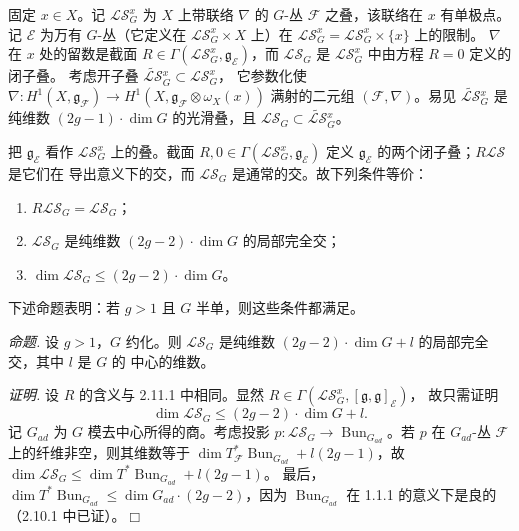  固定 $x\in X$。记 $\mathcal{LS}_G^x$ 为 $X$ 上带联络
$\nabla$ 的 $G$-丛 $\mathcal{F}$ 之叠，该联络在 $x$ 有单极点。
记 $\mathcal{E}$ 为万有 $G$-丛（它定义在
$\mathcal{LS}_G^x\times X$ 上）在
$\mathcal{LS}_G^x=\mathcal{LS}_G^x\times\{x\}$ 上的限制。
$\nabla$ 在 $x$ 处的留数是截面
$R\in\Gamma(\mathcal{LS}_G^x,\mathfrak{g}_{\mathcal{E}})$，而
$\mathcal{LS}_G$ 是 $\mathcal{LS}_G^x$ 中由方程 $R=0$ 定义的闭子叠。
考虑开子叠 $\widetilde{\mathcal{LS}}{}_G^x\subset\mathcal{LS}_G^x$，
它参数化使 $\nabla:H^1(X,\mathfrak{g}_{\mathcal{F}})\to
H^1(X,\mathfrak{g}_{\mathcal{F}}\otimes\omega_X(x))$ 满射的二元组
$(\mathcal{F},\nabla)$。易见 $\widetilde{\mathcal{LS}}{}_G^x$ 是
纯维数 $(2g-1)\cdot\dim G$ 的光滑叠，且
$\mathcal{LS}_G\subset\widetilde{\mathcal{LS}}{}_G^x$。

把 $\mathfrak{g}_{\mathcal{E}}$ 看作 $\mathcal{LS}_G^x$ 上的叠。截面
$R,0\in\Gamma(\mathcal{LS}_G^x,\mathfrak{g}_{\mathcal{E}})$ 定义
$\mathfrak{g}_{\mathcal{E}}$ 的两个闭子叠；$R\mathcal{LS}$ 是它们在
导出意义下的交，而 $\mathcal{LS}_G$ 是通常的交。故下列条件等价：
\begin{enumerate}[label=\arabic*),leftmargin=2.2em]
\item $R\mathcal{LS}_G=\mathcal{LS}_G$；
\item $\mathcal{LS}_G$ 是纯维数 $(2g-2)\cdot\dim G$ 的局部完全交；
\item $\dim\mathcal{LS}_G\le(2g-2)\cdot\dim G$。
\end{enumerate}

下述命题表明：若 $g>1$ 且 $G$ 半单，则这些条件都满足。

 \emph{命题.} 设 $g>1$，$G$ 约化。则 $\mathcal{LS}_G$
是纯维数 $(2g-2)\cdot\dim G+l$ 的局部完全交，其中 $l$ 是 $G$ 的
中心的维数。

\emph{证明.} 设 $R$ 的含义与 2.11.1 中相同。显然
$R\in\Gamma(\mathcal{LS}_G^x,[\mathfrak{g},\mathfrak{g}]_{\mathcal{E}})$，
故只需证明
\begin{equation}\tag{42}
  \dim\mathcal{LS}_G\le(2g-2)\cdot\dim G+l.
\end{equation}
记 $G_{ad}$ 为 $G$ 模去中心所得的商。考虑投影
$p:\mathcal{LS}_G\to\operatorname{Bun}_{G_{ad}}$。若 $p$ 在
$G_{ad}$-丛 $\mathcal{F}$ 上的纤维非空，则其维数等于
$\dim T^{*}_{\mathcal{F}}\operatorname{Bun}_{G_{ad}}+l(2g-1)$，故
$\dim\mathcal{LS}_G\le\dim T^{*}\operatorname{Bun}_{G_{ad}}+l(2g-1)$。
最后，$\dim T^{*}\operatorname{Bun}_{G_{ad}}
\le\dim G_{ad}\cdot(2g-2)$，因为 $\operatorname{Bun}_{G_{ad}}$ 在
1.1.1 的意义下是良的（2.10.1 中已证）。\hfill$\Box$

